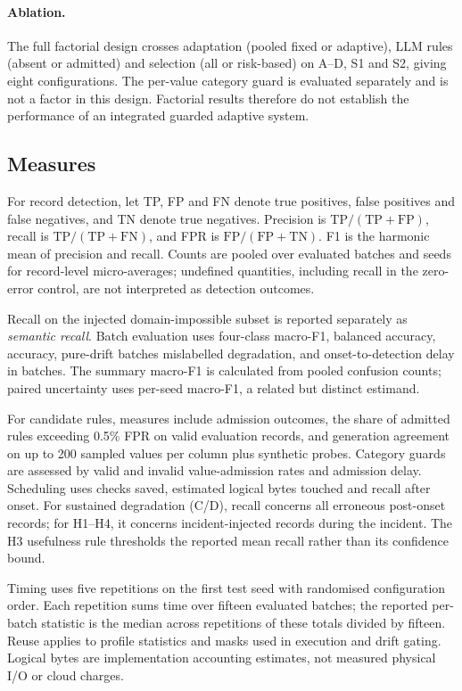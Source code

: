 \paragraph{Ablation.} The full factorial design crosses adaptation (pooled fixed or adaptive), LLM rules (absent or admitted) and selection (all or risk-based) on A--D, S1 and S2, giving eight configurations. The per-value category guard is evaluated separately and is not a factor in this design. Factorial results therefore do not establish the performance of an integrated guarded adaptive system.

\subsection{Measures}

For record detection, let TP, FP and FN denote true positives, false positives and false negatives, and TN denote true negatives. Precision is $\mathrm{TP}/(\mathrm{TP}+\mathrm{FP})$, recall is $\mathrm{TP}/(\mathrm{TP}+\mathrm{FN})$, and FPR is $\mathrm{FP}/(\mathrm{FP}+\mathrm{TN})$. F1 is the harmonic mean of precision and recall. Counts are pooled over evaluated batches and seeds for record-level micro-averages; undefined quantities, including recall in the zero-error control, are not interpreted as detection outcomes.

Recall on the injected domain-impossible subset is reported separately as \emph{semantic recall}. Batch evaluation uses four-class macro-F1, balanced accuracy, accuracy, pure-drift batches mislabelled degradation, and onset-to-detection delay in batches. The summary macro-F1 is calculated from pooled confusion counts; paired uncertainty uses per-seed macro-F1, a related but distinct estimand.

For candidate rules, measures include admission outcomes, the share of admitted rules exceeding 0.5\% FPR on valid evaluation records, and generation agreement on up to 200 sampled values per column plus synthetic probes. Category guards are assessed by valid and invalid value-admission rates and admission delay. Scheduling uses checks saved, estimated logical bytes touched and recall after onset. For sustained degradation (C/D), recall concerns all erroneous post-onset records; for H1--H4, it concerns incident-injected records during the incident. The H3 usefulness rule thresholds the reported mean recall rather than its confidence bound.

Timing uses five repetitions on the first test seed with randomised configuration order. Each repetition sums time over fifteen evaluated batches; the reported per-batch statistic is the median across repetitions of these totals divided by fifteen. Reuse applies to profile statistics and masks used in execution and drift gating. Logical bytes are implementation accounting estimates, not measured physical I/O or cloud charges.


